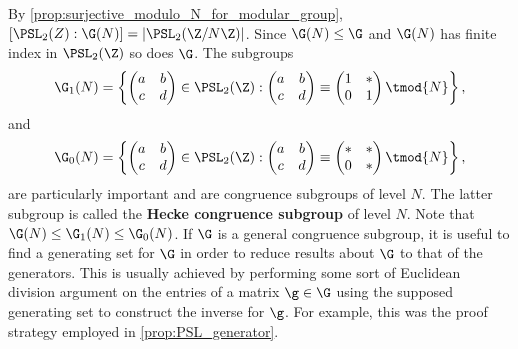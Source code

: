         By \cref{prop:surjective_modulo_N_for_modular_group}, $[\PSL_{2}(Z):\G(N)] = |\PSL_{2}(\Z/N\Z)|$. Since $\G(N) \le \G$ and $\G(N)$ has finite index in $\PSL_{2}(\Z)$ so does $\G$. The subgroups
      \[
        \G_{1}(N) = \left\{\begin{pmatrix} a & b \\ c & d \end{pmatrix} \in \PSL_{2}(\Z):\begin{pmatrix} a & b \\ c & d \end{pmatrix} \equiv \begin{pmatrix} 1 & \ast \\ 0 & 1 \end{pmatrix} \tmod{N}\right\},
      \]
      and
      \[
        \G_{0}(N) = \left\{\begin{pmatrix} a & b \\ c & d \end{pmatrix} \in \PSL_{2}(\Z):\begin{pmatrix} a & b \\ c & d \end{pmatrix} \equiv \begin{pmatrix} \ast & \ast \\ 0 & \ast \end{pmatrix} \tmod{N}\right\},
      \]
      are particularly important and are congruence subgroups of level $N$. The latter subgroup is called the \textbf{Hecke congruence subgroup} of level $N$. Note that $\G(N) \le \G_{1}(N) \le \G_{0}(N)$. If $\G$ is a general congruence subgroup, it is useful to find a generating set for $\G$ in order to reduce results about $\G$ to that of the generators. This is usually achieved by performing some sort of Euclidean division argument on the entries of a matrix $\g \in \G$ using the supposed generating set to construct the inverse for $\g$. For example, this was the proof strategy employed in \cref{prop:PSL_generator}.
